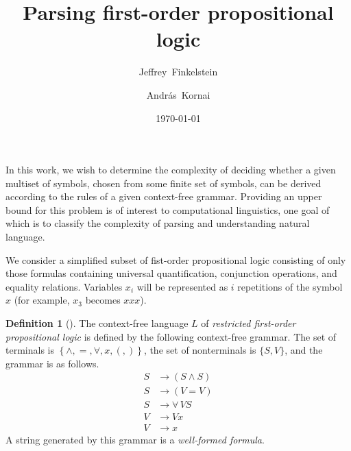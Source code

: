 \documentclass{article}
\author{Jeffrey~Finkelstein \and Andr\'as~Kornai}
\title{Parsing first-order propositional logic}
\date{\today}
\theoremstyle{remark} \newtheorem{technicality}{Technical note}
\theoremstyle{definition} \newtheorem{definition}{Definition}
\theoremstyle{definition} \newtheorem{openproblem}{Open problem}
\newcommand{\yields}{\rightarrow}
\begin{document}
\maketitle

In this work, we wish to determine the complexity of deciding whether a given multiset of symbols, chosen from some finite set of symbols, can be derived according to the rules of a given context-free grammar.
Providing an upper bound for this problem is of interest to computational linguistics, one goal of which is to classify the complexity of parsing and understanding natural language.

We consider a simplified subset of fist-order propositional logic consisting of only those formulas containing universal quantification, conjunction operations, and equality relations.
Variables $x_i$ will be represented as $i$ repetitions of the symbol $x$ (for example, $x_3$ becomes $xxx$).
\begin{definition}[\cite{mp84}]
  The context-free language $L$ of \emph{restricted first-order propositional logic} is defined by the following context-free grammar.
  The set of terminals is $\left\{\land, =, \forall, x, (, ) \right\}$, the set of nonterminals is $\{S, V\}$, and the grammar is as follows.
  \begin{align*}
    S &\yields (S \land S) \\
    S &\yields (V = V) \\
    S &\yields \forall \, V S \\
    V &\yields Vx \\
    V &\yields x
  \end{align*}
  A string generated by this grammar is a \emph{well-formed formula}.
\end{definition}


\end{document}
